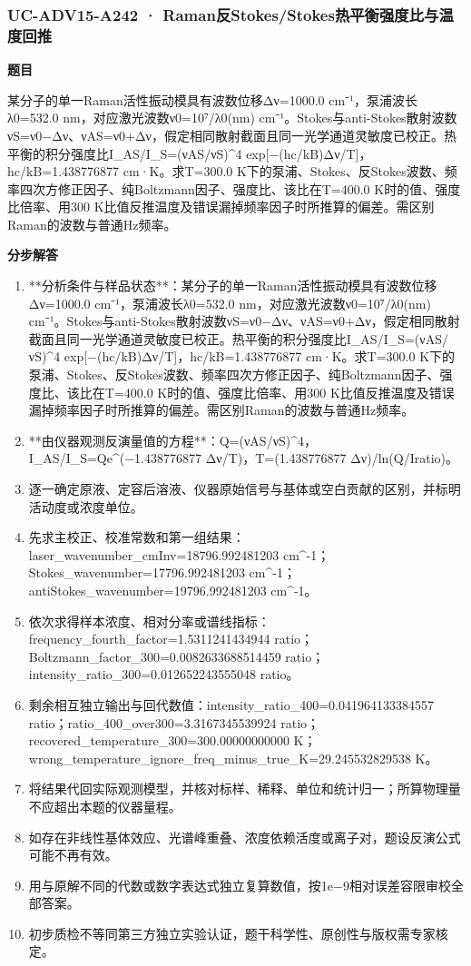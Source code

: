 \documentclass[UTF8,11pt,a4paper]{ctexart}
\begin{document}
\subsubsection*{UC-ADV15-A242 · Raman反Stokes/Stokes热平衡强度比与温度回推}
\noindent\textbf{题目}\par
某分子的单一Raman活性振动模具有波数位移Δν=1000.0 cm⁻¹，泵浦波长λ0=532.0 nm，对应激光波数ν0=10⁷/λ0(nm) cm⁻¹。Stokes与anti-Stokes散射波数νS=ν0−Δν、νAS=ν0+Δν，假定相同散射截面且同一光学通道灵敏度已校正。热平衡的积分强度比I\_AS/I\_S=(νAS/νS)\textasciicircum{}4 exp[−(hc/kB)Δν/T]，hc/kB=1.438776877 cm·K。求T=300.0 K下的泵浦、Stokes、反Stokes波数、频率四次方修正因子、纯Boltzmann因子、强度比、该比在T=400.0 K时的值、强度比倍率、用300 K比值反推温度及错误漏掉频率因子时所推算的偏差。需区别Raman的波数与普通Hz频率。\par
\medskip\noindent\textbf{分步解答}
\begin{enumerate}
\item **分析条件与样品状态**：某分子的单一Raman活性振动模具有波数位移Δν=1000.0 cm⁻¹，泵浦波长λ0=532.0 nm，对应激光波数ν0=10⁷/λ0(nm) cm⁻¹。Stokes与anti-Stokes散射波数νS=ν0−Δν、νAS=ν0+Δν，假定相同散射截面且同一光学通道灵敏度已校正。热平衡的积分强度比I\_AS/I\_S=(νAS/νS)\textasciicircum{}4 exp[−(hc/kB)Δν/T]，hc/kB=1.438776877 cm·K。求T=300.0 K下的泵浦、Stokes、反Stokes波数、频率四次方修正因子、纯Boltzmann因子、强度比、该比在T=400.0 K时的值、强度比倍率、用300 K比值反推温度及错误漏掉频率因子时所推算的偏差。需区别Raman的波数与普通Hz频率。
\item **由仪器观测反演量值的方程**：Q=(νAS/νS)\textasciicircum{}4，I\_AS/I\_S=Qe\textasciicircum{}(−1.438776877 Δν/T)，T=(1.438776877 Δν)/ln(Q/Iratio)。
\item 逐一确定原液、定容后溶液、仪器原始信号与基体或空白贡献的区别，并标明活动度或浓度单位。
\item 先求主校正、校准常数和第一组结果：laser\_wavenumber\_cmInv=18796.992481203 cm\textasciicircum{}-1；Stokes\_wavenumber=17796.992481203 cm\textasciicircum{}-1；antiStokes\_wavenumber=19796.992481203 cm\textasciicircum{}-1。
\item 依次求得样本浓度、相对分率或谱线指标：frequency\_fourth\_factor=1.5311241434944 ratio；Boltzmann\_factor\_300=0.0082633688514459 ratio；intensity\_ratio\_300=0.012652243555048 ratio。
\item 剩余相互独立输出与回代数值：intensity\_ratio\_400=0.041964133384557 ratio；ratio\_400\_over300=3.3167345539924 ratio；recovered\_temperature\_300=300.00000000000 K；wrong\_temperature\_ignore\_freq\_minus\_true\_K=29.245532829538 K。
\item 将结果代回实际观测模型，并核对标样、稀释、单位和统计归一；所算物理量不应超出本题的仪器量程。
\item 如存在非线性基体效应、光谱峰重叠、浓度依赖活度或离子对，题设反演公式可能不再有效。
\item 用与原解不同的代数或数字表达式独立复算数值，按1e−9相对误差容限审校全部答案。
\item 初步质检不等同第三方独立实验认证，题干科学性、原创性与版权需专家核定。
\end{enumerate}
\end{document}
